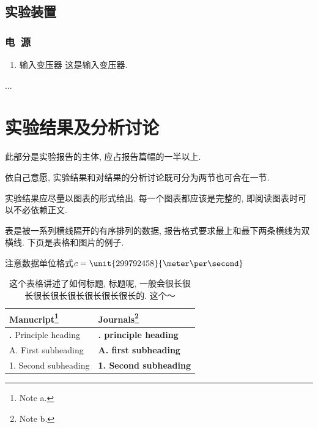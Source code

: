 \documentclass[12pt,a4paper]{article}
\begin{document}
\begin{spacing}{2}
\subsection{实验装置}
\subsubsection{电~源}
\begin{enumerate}
\item {\fangsong 输入变压器} 
这是输入变压器. %
\end{enumerate}
...

\section{实验结果及分析讨论}
此部分是实验报告的主体, 应占报告篇幅的一半以上.\par
依自己意愿, 实验结果和对结果的分析讨论既可分为两节也可合在一节.\par
实验结果应尽量以图表的形式给出. 每一个图表都应该是完整的, 即阅读图表时可以不必依赖正文.\par
表是被一系列横线隔开的有序排列的数据, 报告格式要求最上和最下两条横线为双横线. 下页是表格和图片的例子.\par
注意数据单位格式$c = \unit{299792458}{\meter\per\second}$

\begin{table}[htbp]
\caption{这个表格讲述了如何标题, 标题呢, 一般会很长很长很长很长很长很长很长很长的. 这个～}
\label{tab:table1}
\begin{minipage}{\textwidth}
\begin{tabularx}{\textwidth}{ll}
 \hline\hline
  Manucript\footnote{Note a.} & Journals\footnote{Note b.} \\
 \midrule
  {\bf\uppercase\expandafter{\romannumeral 1}.} Principle heading & {\bf\uppercase\expandafter{\romannumeral 1}. principle heading} \\
  A. First subheading & {\bf A. first subheading} \\
  1. Second subheading & {\bf 1. Second subheading} \\
 \hline\hline
\end{tabularx}
\end{minipage}
\end{table}


\end{spacing}
\end{document}
